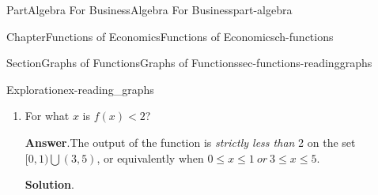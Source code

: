 \documentclass{tufte-book}
\newcommand{\blocktitlefont}{\relax}
\numberwithin{equation}{chapter}
\newcommand{\lt}{<}
\begin{document}
\begin{partptx}{Part}{Algebra For Business}{}{Algebra For Business}{}{}{part-algebra}
\begin{chapterptx}{Chapter}{Functions of Economics}{}{Functions of Economics}{}{}{ch-functions}
\begin{sectionptx}{Section}{Graphs of Functions}{}{Graphs of Functions}{}{}{sec-functions-readinggraphs}
\begin{exploration}{Exploration}{}{ex-reading_graphs}
\begin{enumerate}[font=\bfseries,label=(\alph*),ref=\alph*]
\par
Finally, solving \(f(x) = 0\) means finding the inputs \(x\) that have a height \(y\) of zero.  Looking at the graph, this happens only for \(x=4\).%
\item{}For what  \(x\) is \(f(x)\lt 2\)?%
\par\smallskip%
\noindent\textbf{\blocktitlefont Answer}.\hypertarget{ex-reading_graphs-4-2}{}\quad{}The output of the function is \emph{strictly less than} 2 on the set \([0,1)\bigcup(3,5)\), or equivalently when \(0\leq x\leq 1\ or\ 3\leq x\leq 5\).%
\par\smallskip%
\noindent\textbf{\blocktitlefont Solution}.\hypertarget{ex-reading_graphs-4-3}{}\quad{}\begin{image}{0.25}{0.5}{0.25}{}%
\end{image}
\end{enumerate}
\end{exploration}
\end{sectionptx}
\end{chapterptx}
\end{partptx}
\end{document}
